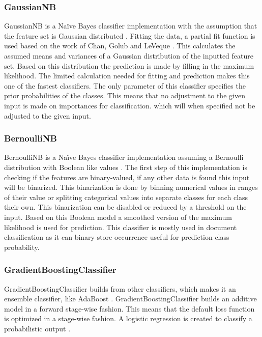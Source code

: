 \documentclass[a4paper,10pt]{article}
\begin{document}
\subsubsection{GaussianNB}
GaussianNB is a Naïve Bayes classifier implementation with the  assumption that the feature set is Gaussian distributed \cite{Bayes}. Fitting the data, a partial fit function is used based on the work of Chan, Golub and LeVeque \cite{Sam-var}. This calculates the assumed means and variances of a Gaussian distribution of the inputted feature set. Based on this distribution the prediction is made by filling in the maximum likelihood. The limited calculation needed for fitting and prediction makes this one of the fastest classifiers. The only parameter of this classifier specifies the prior probabilities of the classes. This means that no adjustment to the given input is made on importances for classification. which will when specified not be adjusted to the given input. 

\subsubsection{BernoulliNB}
BernoulliNB is a Naïve Bayes classifier implementation assuming a Bernoulli distribution with Boolean like values \cite{NB-text}. The first step of this implementation is checking if the features are binary-valued, if any other data is found this input will be binarized. This binarization is done by binning numerical values in ranges of their value or splitting categorical values into separate classes for each class their own. This binarization can be disabled or reduced by a threshold on the input. Based on this Boolean model a smoothed version of the maximum likelihood is used for prediction. This classifier is mostly used in document classification as it can binary store occurrence useful for prediction class probability.

\subsubsection{GradientBoostingClassifier}
GradientBoostingClassifier builds from other classifiers, which makes it an ensemble classifier, like AdaBoost \cite{GradientBoost}. GradientBoostingClassifier builds an additive model in a forward stage-wise fashion. This means that the default loss function is optimized in a stage-wise fashion. A logistic regression is created to classify a probabilistic output \cite{Greedy-GBC}. 
\end{document}

